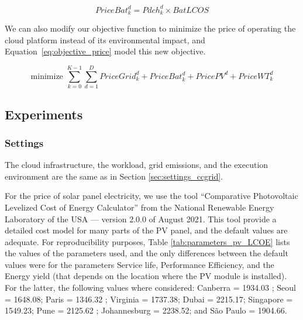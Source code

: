 \begin{equation} \label{eq:pricebat}
   PriceBat^d_k = Pdch^d_k \times BatLCOS
\end{equation}


We can also modify our objective function to minimize the price of operating the cloud platform instead of its environmental impact, and Equation~\eqref{eq:objective_price} model this new objective.

\begin{equation} \label{eq:objective_price}
\text{minimize }\sum_{k=0}^{K-1} \sum_{d=1}^D PriceGrid^d_k  + PriceBat^d_k + PricePV^d+ PriceWT^d_k
\end{equation}


\subsection{Experiments}

\subsubsection{Settings}

The cloud infrastructure, the workload, grid emissions, and the execution environment are the same as in Section  \ref{sec:settings_ccgrid}.

For the price of solar panel electricity, we use the tool ``Comparative Photovoltaic Levelized Cost of Energy Calculator'' from the National Renewable Energy Laboratory of the USA \cite{pv_lcoe_calc} --- version 2.0.0 of August 2021. This tool provide a detailed cost model for many parts of the PV panel, and the default values are adequate. For reproducibility purposes, Table \ref{tab:parameters_pv_LCOE} lists the values of the parameters used, and the only differences between the default values were for the parameters Service life, Performance Efficiency, and the Energy yield (that depends on the location where the PV module is installed). For the latter, the following values where considered: Canberra = 1934.03 ; Seoul  = 1648.08; Paris = 1346.32 ; Virginia = 1737.38; Dubai =  2215.17; Singapore = 1549.23; Pune =  2125.62 ; Johannesburg = 2238.52; and São Paulo =  1904.66.

